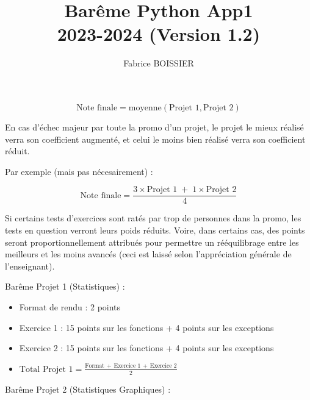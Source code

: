 \documentclass[12pt,a4paper]{article}
\newcommand{\VersionExo}{Version 1.2}
\begin{document}
\title{Barême Python App1\\
       \large 2023-2024 (\VersionExo)}

\author{Fabrice BOISSIER}

\maketitle

\thispagestyle{empty} %


\begin{equation*}
\text{Note finale} = \text{moyenne}(\text{Projet 1}, \text{Projet 2})
\end{equation*}


\medskip

\noindent En cas d'échec majeur par toute la promo d'un projet, le projet le mieux réalisé verra son coefficient augmenté, et celui le moins bien réalisé verra son coefficient réduit.

\noindent Par exemple (mais pas nécesairement) :

\begin{equation*}
\text{Note finale} = \frac{3 \times \text{Projet 1} \; + \; 1 \times \text{Projet 2}}{4}
\end{equation*}

\medskip

\noindent Si certains tests d'exercices sont ratés par trop de personnes dans la promo, les tests en question verront leurs poids réduits.
Voire, dans certains cas, des points seront proportionnellement attribués pour permettre un rééquilibrage entre les meilleurs et les moins avancés (ceci est laissé selon l'appréciation générale de l'enseignant).

\bigskip


\noindent Barême Projet 1 (Statistiques) :

\begin{itemize}
\item Format de rendu : 2 points
\item Exercice 1 : 15 points sur les fonctions + 4 points sur les exceptions
\item Exercice 2 : 15 points sur les fonctions + 4 points sur les exceptions
\item $ \text{Total Projet 1} = \frac{\text{Format} \, + \, \text{Exercice 1} \, + \, \text{Exercice 2}}{2} $
\end{itemize}


\bigskip


\noindent Barême Projet 2 (Statistiques Graphiques) :
\end{document}
